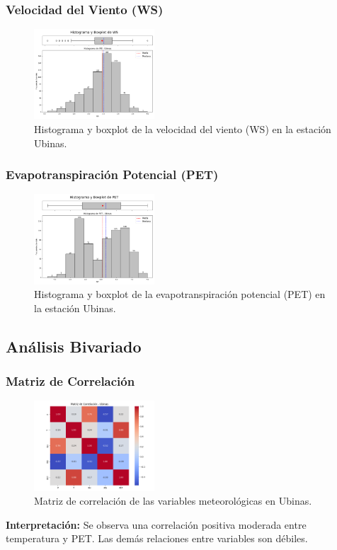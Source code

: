 \subsubsection*{Velocidad del Viento (WS)}
\begin{figure}[H]
\centering
\includegraphics[width=0.4\textwidth]{resultados/por_estacion_meteorologica/Ubinas/WS_histograma.png}
\caption{Histograma y boxplot de la velocidad del viento (WS) en la estación Ubinas.}
\label{fig:ubinas_WS}
\end{figure}

\subsubsection*{Evapotranspiración Potencial (PET)}
\begin{figure}[H]
\centering
\includegraphics[width=0.4\textwidth]{resultados/por_estacion_meteorologica/Ubinas/PET_histograma.png}
\caption{Histograma y boxplot de la evapotranspiración potencial (PET) en la estación Ubinas.}
\label{fig:ubinas_PET}
\end{figure}

\subsection{Análisis Bivariado}

\subsubsection*{Matriz de Correlación}
\begin{figure}[H]
\centering
\includegraphics[width=0.4\textwidth]{resultados/por_estacion_meteorologica/Ubinas/matriz_correlacion.png}
\caption{Matriz de correlación de las variables meteorológicas en Ubinas.}
\label{fig:ubinas_corr}
\end{figure}
\textbf{Interpretación:} Se observa una correlación positiva moderada entre temperatura y PET. Las demás relaciones entre variables son débiles.

